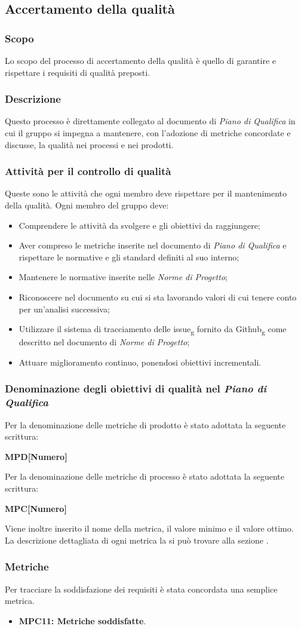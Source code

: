 \subsection{Accertamento della qualità}

\subsubsection{Scopo}
Lo scopo del processo di accertamento della qualità è quello di garantire e rispettare i requisiti di qualità preposti.
\subsubsection{Descrizione}
Questo processo è direttamente collegato al documento di \textit{Piano di Qualifica} in cui il gruppo si impegna a mantenere, con l'adozione di metriche concordate e discusse, la qualità nei processi e nei prodotti.
\subsubsection{Attività per il controllo di qualità}
Queste sono le attività che ogni membro deve rispettare per il mantenimento della qualità.
Ogni membro del gruppo deve:
\begin{itemize}
\item Comprendere le attività da svolgere e gli obiettivi da raggiungere;
\item Aver compreso le metriche inserite nel documento di \textit{Piano di Qualifica} e rispettare le normative e gli standard definiti al suo interno;
\item Mantenere le normative inserite nelle \textit{Norme di Progetto};
\item Riconoscere nel documento su cui si sta lavorando valori di cui tenere conto per un'analisi successiva;
\item Utilizzare il sistema di tracciamento delle issue\textsubscript{g} fornito da Github\textsubscript{g} come descritto nel documento di \textit{Norme di Progetto};
\item Attuare miglioramento continuo, ponendosi obiettivi incrementali.
\end{itemize}
\subsubsection{Denominazione degli obiettivi di qualità nel \textit{Piano di Qualifica}}
Per la denominazione delle metriche di prodotto è stato adottata la seguente scrittura:
\begin{center}\textbf{MPD[Numero]}\end{center}
Per la denominazione delle metriche di processo è stato adottata la seguente scrittura:
\begin{center}\textbf{MPC[Numero]}\end{center}
Viene inoltre inserito il nome della metrica, il valore minimo e il valore ottimo.\\
La descrizione dettagliata di ogni metrica la si può trovare alla sezione .
\subsubsection{Metriche} 
Per tracciare la soddisfazione dei requisiti è stata concordata una semplice metrica.
\begin{itemize}
    \item \textbf{MPC11: Metriche soddisfatte}.
\end{itemize}
